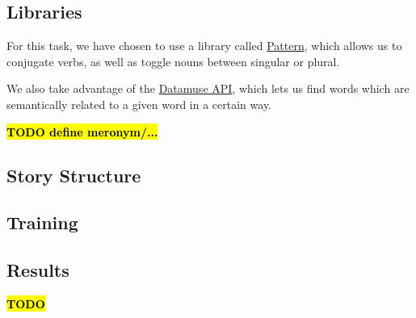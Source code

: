 \subsection{Libraries}

For this task, we have chosen to use a library called \href{http://web.archive.org/web/20190516161631/https://www.clips.uantwerpen.be/pages/pattern-en}{Pattern}, which allows us to conjugate verbs, as well as toggle nouns between singular or plural.

We also take advantage of the \href{https://www.datamuse.com/api/}{Datamuse API}, which lets us find words which are semantically related to a given word in a certain way.

\textcolor{red}{\textbf{\hl{TODO define meronym/...}}}

\subsection{Story Structure}

\subsection{Training}

\subsection{Results}

\textcolor{red}{\textbf{\hl{TODO}}}